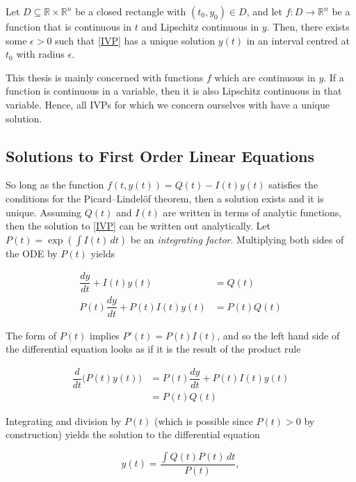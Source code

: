 \begin{theorem}
	Let $D \subseteq \mathbb{R} \times \mathbb{R}^n$ be a closed rectangle with $(t_0, y_0) \in D$, and let $f : D \to \mathbb{R}^n$ be a function that is continuous in $t$ and Lipschitz continuous in $y$.  Then, there exists some $\epsilon>0$ such that \cref{IVP} has a unique solution $y(t)$ in an interval centred at $t_0$ with radius $\epsilon$.
\end{theorem}

\noindent This thesis is mainly concerned with functions $f$ which are continuous in $y$.  If a function is continuous in a variable, then it is also Lipschitz continuous in that variable.  Hence, all IVPs for which we concern ourselves with have a unique solution. 


\subsection{Solutions to First Order Linear Equations}

So long as the function $f(t, y(t)) = Q(t) - I(t) y(t)$ satisfies the conditions for the Picard–Lindelöf theorem, then a solution exists and it is unique.  Assuming $Q(t)$ and $I(t)$ are written in terms of analytic functions, then the solution to \cref{IVP} can be written out analytically.  Let $P(t) = \exp(\int I(t) \, dt)$ be an \textit{integrating factor}.  Multiplying both sides of the ODE by $P(t)$ yields

\begin{align}
	\dfrac{dy}{dt} + I(t)y(t) &= Q(t) \\
	P(t)\dfrac{dy}{dt} + P(t)I(t)y(t) &= P(t)Q(t) 
\end{align}

\noindent  The form of $P(t)$ implies $P'(t) = P(t)I(t)$, and so the left hand side of the differential equation looks as if it is the result of the product rule

\begin{align}
 \dfrac{d}{dt} \Big( P(t)y(t) \Big) &= P(t)\dfrac{dy}{dt} + P(t)I(t)y(t) \\
														  &= P(t) Q(t)
\end{align}

\noindent Integrating and division by $P(t)$ (which is possible since $P(t)>0$ by construction) yields the solution to the differential equation

\begin{equation}
	y(t) = \dfrac{\int Q(t) P(t)\, dt}{P(t)},
\end{equation}

